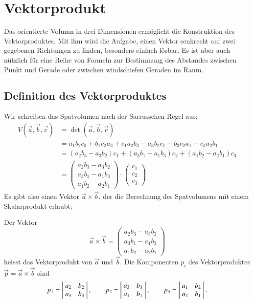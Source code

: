 %
%
%

\section{Vektorprodukt}
Das orientierte Volumn in drei Dimensionen ermöglicht die Konstruktion 
des Vektorproduktes.
Mit ihm wird die Aufgabe, einen Vektor senkrecht auf zwei gegebenen
Richtungen zu finden, besonders einfach lösbar.
Es ist aber auch nützlich für eine Reihe von Formeln zur Bestimmung
des Abstandes zwischen Punkt und Gerade oder zwischen windschiefen
Geraden im Raum.

\subsection{Definition des Vektorproduktes}
Wir schreiben das Spatvolumen nach der Sarrusschen Regel aus:
\begin{align*}
V(\vec a,\vec b,\vec c)&=\det(\vec a,\vec b,\vec c)\\
&=
a_1b_2c_3+b_1c_2a_3+c_1a_2b_3
-a_3b_2c_1-b_3c_2a_1-c_3a_2b_1\\
&=
(a_2b_3-a_3b_2)c_1+(a_3b_1-a_1b_3)c_2+(a_1b_2-a_2b_1)c_3
\\
&=
\begin{pmatrix}
a_2b_3-a_3b_2\\
a_3b_1-a_1b_3\\
a_1b_2-a_2b_1
\end{pmatrix}
\cdot
\begin{pmatrix}
c_1\\c_2\\c_3
\end{pmatrix}
\end{align*}
Es gibt also einen Vektor $\vec a\times\vec b$, der die Berechnung
des Spatvolumens mit einem Skalarprodukt erlaubt:
\begin{definition}
Der Vektor
\[
\vec a\times\vec b= \begin{pmatrix}
a_2b_3-a_3b_2\\
a_3b_1-a_1b_3\\
a_1b_2-a_2b_1
\end{pmatrix}
\]
heisst das Vektorprodukt von $\vec a$ und $\vec b$.
Die Komponenten $p_i$
des Vektorproduktes $\vec p=\vec a\times \vec b$ sind
\[
p_1
=
\left|\;\begin{matrix}
a_2&b_2\\a_3&b_3
\end{matrix}\;\right|\\
,\qquad p_2=
\left|\;\begin{matrix}
a_3&b_3\\a_1&b_1
\end{matrix}\;\right|\\
,\qquad p_3=
\left|\;\begin{matrix}
a_1&b_2\\a_2&b_1
\end{matrix}\;\right|.
\]
\end{definition}
